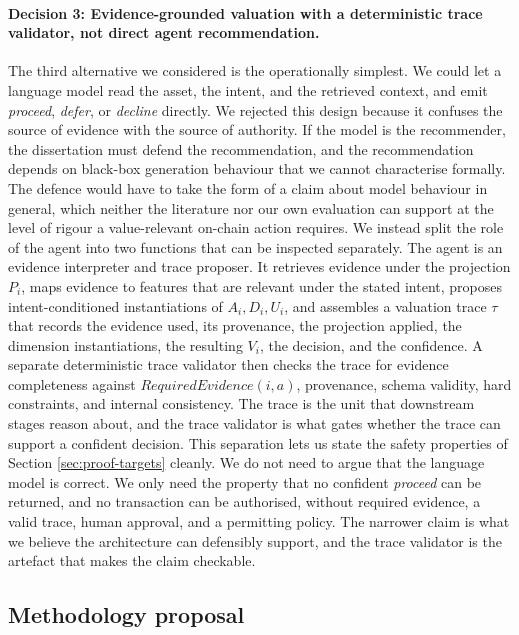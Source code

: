 \paragraph{Decision 3: Evidence-grounded valuation with a deterministic trace validator, not direct agent recommendation.}
The third alternative we considered is the operationally simplest. We could let a language model read the asset, the intent, and the retrieved context, and emit \textit{proceed}, \textit{defer}, or \textit{decline} directly. We rejected this design because it confuses the source of evidence with the source of authority. If the model is the recommender, the dissertation must defend the recommendation, and the recommendation depends on black-box generation behaviour that we cannot characterise formally. The defence would have to take the form of a claim about model behaviour in general, which neither the literature nor our own evaluation can support at the level of rigour a value-relevant on-chain action requires. We instead split the role of the agent into two functions that can be inspected separately. The agent is an evidence interpreter and trace proposer. It retrieves evidence under the projection $P_i$, maps evidence to features that are relevant under the stated intent, proposes intent-conditioned instantiations of $A_i, D_i, U_i$, and assembles a valuation trace $\tau$ that records the evidence used, its provenance, the projection applied, the dimension instantiations, the resulting $V_i$, the decision, and the confidence. A separate deterministic trace validator then checks the trace for evidence completeness against $\textit{RequiredEvidence}(i, a)$, provenance, schema validity, hard constraints, and internal consistency. The trace is the unit that downstream stages reason about, and the trace validator is what gates whether the trace can support a confident decision. This separation lets us state the safety properties of Section \ref{sec:proof-targets} cleanly. We do not need to argue that the language model is correct. We only need the property that no confident \textit{proceed} can be returned, and no transaction can be authorised, without required evidence, a valid trace, human approval, and a permitting policy. The narrower claim is what we believe the architecture can defensibly support, and the trace validator is the artefact that makes the claim checkable.

\subsection{Methodology proposal}

